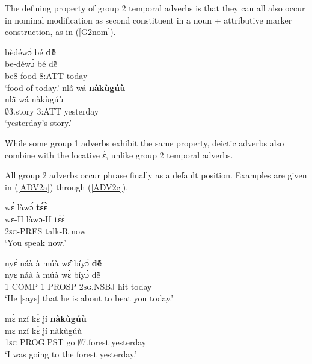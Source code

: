 The defining property of group 2 temporal adverbs is that they can all also occur in nominal modification as second constituent in a noun + attributive marker construction, as in (\ref{G2nom}).

\begin{exe}
\ex\label{G2nom}
\begin{xlist}
\ex \label{G2nom1}
  \glll   bèdéwɔ̀ bé {\bfseries dẽ̂} \\
	be-déwɔ̀ bé dẽ̂  \\
           be8-food 8:ATT today    \\
    \trans `food of today.'
\ex\label{G2nom2}
 \glll  nlã̂ wá {\bfseries nàkùgúù} \\
	nlã̂ wá nàkùgúù \\
         $\emptyset$3.story 3:ATT yesterday  \\
    \trans `yesterday's story.'
\end{xlist}
\end{exe}

\noindent While some group 1 adverbs exhibit the same property, deictic adverbs also combine with the locative {\itshape ɛ́}, unlike group 2 temporal adverbs.


All group 2 adverbs occur phrase finally as a default position. Examples are given in (\ref{ADV2a}) through (\ref{ADV2c}).

\begin{exe} 
\ex\label{ADV2a} 
  \glll wɛ́ làwɔ́ {\bfseries tɛ́ɛ̀}  \\
        wɛ-H làwɔ-H tɛ́ɛ̀  \\
         2\textsc{sg}-PRES talk-R now   \\
    \trans `You speak now.'
\end{exe}

\begin{exe} 
\ex\label{ADV2b}
  \glll  nyɛ̀ náà à múà wɛ̂ bíyɔ̀ {\bfseries dẽ̂} \\
        nyɛ náà à múà wɛ̀ bíyɔ̀ dẽ̂\\
           1 COMP 1 PROSP 2\textsc{sg}.NSBJ hit today \\
    \trans `He [says] that he is about to beat you today.'
\end{exe}

\begin{exe} 
\ex\label{ADV2c}
  \glll mɛ̀ nzí kɛ̀ jí {\bfseries nàkùgúù} \\
       mɛ nzí kɛ̀ jí nàkùgúù \\
      1\textsc{sg} PROG.PST go $\emptyset$7.forest yesterday \\
    \trans `I was going to the forest yesterday.'
\end{exe}

